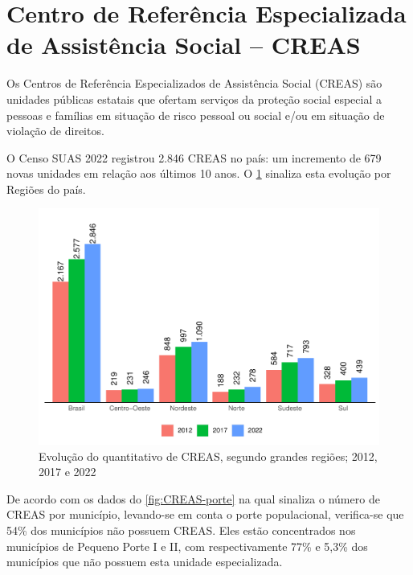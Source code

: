 \documentclass[
  brazilian]{report}
\begin{document}
\hypertarget{centro-de-referuxeancia-especializada-de-assistuxeancia-social-creas}{%
\section{Centro de Referência Especializada de Assistência Social --
CREAS}\label{centro-de-referuxeancia-especializada-de-assistuxeancia-social-creas}}

Os Centros de Referência Especializados de Assistência Social (CREAS)
são unidades públicas estatais que ofertam serviços da proteção social
especial a pessoas e famílias em situação de risco pessoal ou social
e/ou em situação de violação de direitos.

O Censo SUAS 2022 registrou 2.846 CREAS no país: um incremento de 679
novas unidades em relação aos últimos 10 anos. O
\cref{fig:creas-quantitativo} sinaliza esta evolução por Regiões do
país.

\begin{figure}
\includegraphics{Censo-SUAS-2022_files/figure-latex/creas-quantitativo-1} \caption[Evolução do quantitativo de CREAS, segundo grandes regiões]{Evolução do quantitativo de CREAS, segundo grandes regiões; 2012, 2017 e 2022}\label{fig:creas-quantitativo}
\end{figure}

De acordo com os dados do \cref{fig:CREAS-porte} na qual sinaliza o
número de CREAS por município, levando-se em conta o porte populacional,
verifica-se que 54\% dos municípios não possuem CREAS. Eles estão
concentrados nos municípios de Pequeno Porte I e II, com respectivamente
77\% e 5,3\% dos municípios que não possuem esta unidade especializada.
\end{document}
